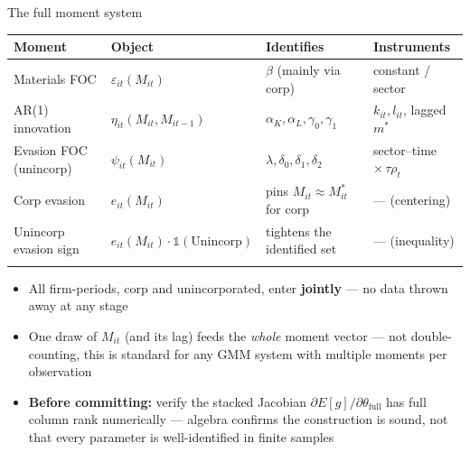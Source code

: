 \documentclass[
  ignorenonframetext,
  aspectratio=169,
]{beamer}
\newcounter{none} %
\providecommand{\tightlist}{%
  \setlength{\itemsep}{0pt}\setlength{\parskip}{0pt}}
\begin{document}
\begin{frame}{The full moment system}
\protect{}\label{the-full-moment-system}
\footnotesize

{\def\LTcaptype{none} %
\begin{longtable}[]{@{}
  >{\raggedright\arraybackslash}p{}
  >{\raggedright\arraybackslash}p{}
  >{\raggedright\arraybackslash}p{}
  >{\raggedright\arraybackslash}p{}@{}}
\toprule\noalign{}
\begin{minipage}[b]{\linewidth}\raggedright
Moment
\end{minipage} & \begin{minipage}[b]{\linewidth}\raggedright
Object
\end{minipage} & \begin{minipage}[b]{\linewidth}\raggedright
Identifies
\end{minipage} & \begin{minipage}[b]{\linewidth}\raggedright
Instruments
\end{minipage} \\
\midrule\noalign{}
\endhead
Materials FOC & \(\varepsilon_{it}(M_{it})\) & \(\beta\) (mainly via
corp) & constant / sector \\
AR(1) innovation & \(\eta_{it}(M_{it},M_{it-1})\) &
\(\alpha_K,\alpha_L,\gamma_0,\gamma_1\) & \(k_{it},l_{it}\), lagged
\(m^*\) \\
Evasion FOC (unincorp) & \(\psi_{it}(M_{it})\) &
\(\lambda,\delta_0,\delta_1,\delta_2\) & sector--time
\(\times\,\tau\rho_t\) \\
Corp evasion & \(e_{it}(M_{it})\) & pins \(M_{it}\approx M^*_{it}\) for
corp & --- (centering) \\
Unincorp evasion sign &
\(e_{it}(M_{it})\cdot\mathbb 1(\text{Unincorp})\) & tightens the
identified set & --- (inequality) \\
\bottomrule\noalign{}
\end{longtable}
}

\begin{itemize}
\tightlist
\item
  All firm-periods, corp and unincorporated, enter \textbf{jointly} ---
  no data thrown away at any stage
\item
  One draw of \(M_{it}\) (and its lag) feeds the \emph{whole} moment
  vector --- not double-counting, this is standard for any GMM system
  with multiple moments per observation
\item
  \textbf{Before committing:} verify the stacked Jacobian
  \(\partial E[g]/\partial\theta_{\text{full}}\) has full column rank
  numerically --- algebra confirms the construction is sound, not that
  every parameter is well-identified in finite samples
\end{itemize}
\end{frame}
\end{document}
